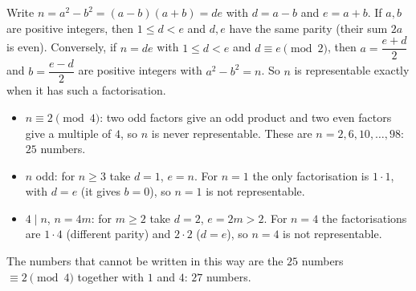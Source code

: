 Write $n=a^2-b^2=(a-b)(a+b)=de$ with $d=a-b$ and $e=a+b$. If $a,b$ are positive integers, then $1\le d<e$ and $d,e$ have the same parity (their sum $2a$ is even). Conversely, if $n=de$ with $1\le d<e$ and $d\equiv e\pmod 2$, then $a=\dfrac{e+d}{2}$ and $b=\dfrac{e-d}{2}$ are positive integers with $a^2-b^2=n$. So $n$ is representable exactly when it has such a factorisation.
\begin{itemize}
\item $n\equiv2\pmod4$: two odd factors give an odd product and two even factors give a multiple of $4$, so $n$ is never representable. These are $n=2,6,10,\dots,98$: $25$ numbers.
\item $n$ odd: for $n\ge3$ take $d=1$, $e=n$. For $n=1$ the only factorisation is $1\cdot1$, with $d=e$ (it gives $b=0$), so $n=1$ is not representable.
\item $4\mid n$, $n=4m$: for $m\ge2$ take $d=2$, $e=2m>2$. For $n=4$ the factorisations are $1\cdot4$ (different parity) and $2\cdot2$ ($d=e$), so $n=4$ is not representable.
\end{itemize}
The numbers that cannot be written in this way are the $25$ numbers $\equiv2\pmod4$ together with $1$ and $4$: $\boxed{27}$ numbers.
